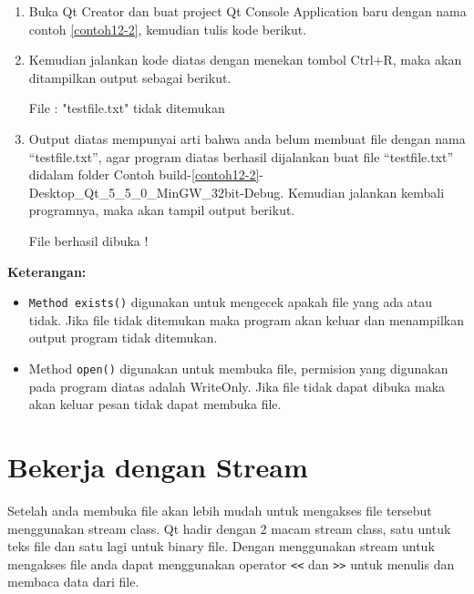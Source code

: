 \begin{enumerate}

\item
  Buka Qt Creator dan buat project Qt Console Application baru dengan
  nama contoh \ref{contoh12-2}, kemudian tulis kode berikut.


\item
  Kemudian jalankan kode diatas dengan menekan tombol Ctrl+R, maka akan
  ditampilkan output sebagai berikut.
  
  \begin{lcverbatim}
File :  "testfile.txt"  tidak ditemukan
  \end{lcverbatim}
\item
  Output diatas mempunyai arti bahwa anda belum membuat file dengan nama
  ``testfile.txt'', agar program diatas berhasil dijalankan buat file
  ``testfile.txt'' didalam folder Contoh build-\ref{contoh12-2}-Desktop\_Qt\_5\_5\_0\_MinGW\_32bit-Debug.
   Kemudian  jalankan kembali programnya, maka akan tampil output berikut.
  
  \begin{lcverbatim}
File berhasil dibuka !
  \end{lcverbatim}
  
\end{enumerate}

\textbf{Keterangan:}

\begin{itemize}

\item
  \texttt{Method\ exists()} digunakan untuk mengecek apakah file yang
  ada atau tidak. Jika file tidak ditemukan maka program akan keluar dan
  menampilkan output program tidak ditemukan.
\item
  Method \texttt{open()} digunakan untuk membuka file, permision yang
  digunakan pada program diatas adalah WriteOnly. Jika file tidak dapat
  dibuka maka akan keluar pesan tidak dapat membuka file.
\end{itemize}

\section{Bekerja dengan Stream}\label{bekerja-dengan-stream}

Setelah anda membuka file akan lebih mudah untuk mengakses file tersebut
menggunakan stream class. Qt hadir dengan 2 macam stream class, satu
untuk teks file dan satu lagi untuk binary file. Dengan menggunakan
stream untuk mengakses file anda dapat menggunakan operator
\texttt{\textless{}\textless{}} dan
\texttt{\textgreater{}\textgreater{}} untuk menulis dan membaca data
dari file.

